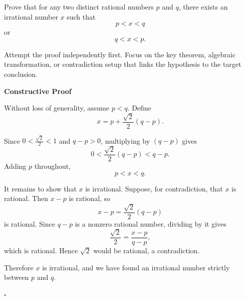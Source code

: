 
\begin{problem}
Prove that for any two distinct rational numbers $p$ and $q$, there exists an irrational number $x$ such that
\[
p < x < q
\]
or
\[
q < x < p.
\]
\end{problem}

\begin{hint}
Attempt the proof independently first. Focus on the key theorem, algebraic transformation, or contradiction setup that links the hypothesis to the target conclusion.
\end{hint}

\begin{solution}
\textbf{Constructive Proof}

Without loss of generality, assume $p<q$.
Define
\[
x=p+\frac{\sqrt{2}}{2}(q-p).
\]

Since $0<\frac{\sqrt{2}}{2}<1$ and $q-p>0$, multiplying by $(q-p)$ gives
\[
0<\frac{\sqrt{2}}{2}(q-p)<q-p.
\]
Adding $p$ throughout,
\[
p<x<q.
\]

It remains to show that $x$ is irrational. Suppose, for contradiction, that $x$ is rational.
Then $x-p$ is rational, so
\[
x-p=\frac{\sqrt{2}}{2}(q-p)
\]
is rational.
Since $q-p$ is a nonzero rational number, dividing by it gives
\[
\frac{\sqrt{2}}{2}=\frac{x-p}{q-p},
\]
which is rational. Hence $\sqrt{2}$ would be rational, a contradiction.

Therefore $x$ is irrational, and we have found an irrational number strictly between $p$ and $q$.

\hfill $\square$
\end{solution}

